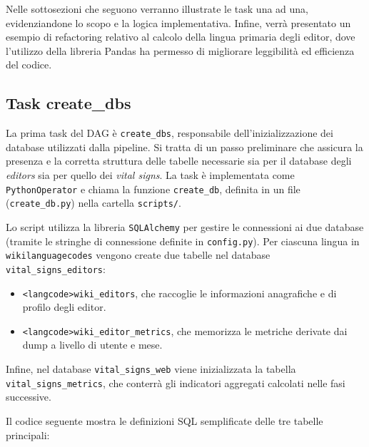 Nelle sottosezioni che seguono verranno illustrate le task una ad una, evidenziandone lo scopo e la logica implementativa.
Infine, verrà presentato un esempio di refactoring relativo al calcolo della lingua primaria degli editor, dove l’utilizzo della libreria Pandas ha permesso di migliorare leggibilità ed efficienza del codice.
\subsection{Task create\_dbs}
\label{subsec:create_dbs}

La prima task del DAG è \texttt{create\_dbs}, responsabile dell’inizializzazione dei database utilizzati dalla pipeline. 
Si tratta di un passo preliminare che assicura la presenza e la corretta struttura delle tabelle necessarie sia per il database degli \emph{editors} sia per quello dei \emph{vital signs}. 
La task è implementata come \texttt{PythonOperator} e chiama la funzione \texttt{create\_db}, definita in un file (\texttt{create\_db.py}) nella cartella \texttt{scripts/}.

Lo script utilizza la libreria \texttt{SQLAlchemy} per gestire le connessioni ai due database (tramite le stringhe di connessione definite in \texttt{config.py}). 
Per ciascuna lingua in \texttt{wikilanguagecodes} vengono create due tabelle nel database \texttt{vital\_signs\_editors}:

\begin{itemize}
    \item \texttt{<langcode>wiki\_editors}, che raccoglie le informazioni anagrafiche e di profilo degli editor.
    \item \texttt{<langcode>wiki\_editor\_metrics}, che memorizza le metriche derivate dai dump a livello di utente e mese.
\end{itemize}

Infine, nel database \texttt{vital\_signs\_web} viene inizializzata la tabella \texttt{vital\_signs\_metrics}, che conterrà gli indicatori aggregati calcolati nelle fasi successive. 

Il codice seguente mostra le definizioni SQL semplificate delle tre tabelle principali:

\newpage 


